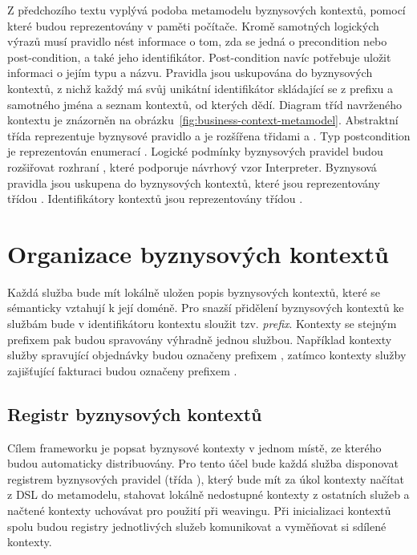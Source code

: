 Z předchozího textu vyplývá podoba metamodelu byznysových kontextů, pomocí které
budou reprezentovány v paměti počítače. Kromě samotných logických výrazů musí pravidlo nést
informace o tom, zda se jedná o precondition nebo post-condition, a také jeho identifikátor.
Post-condition navíc potřebuje uložit informaci o jejím typu a názvu. Pravidla jsou uskupována
do byznysových kontextů, z nichž každý má svůj unikátní identifikátor skládající se z prefixu
a samotného jména a seznam kontextů, od kterých dědí. Diagram tříd navrženého kontextu je znázorněn
na obrázku~\ref{fig:business-context-metamodel}. Abstraktní třída  reprezentuje
byznysové pravidlo a je rozšířena třidami  a . Typ
postcondition je reprezentován enumerací . Logické podmínky
byznysových pravidel budou rozšiřovat rozhraní , které podporuje návrhový vzor
Interpreter. Byznysová pravidla jsou uskupena do byznysových kontextů, které jsou reprezentovány
třídou . Identifikátory kontextů jsou reprezentovány třídou .

\section{Organizace byznysových kontextů}

Každá služba bude mít lokálně uložen popis byznysových kontextů, které se sémanticky vztahují
k její doméně. Pro snazší přidělení byznysových kontextů ke službám bude v identifikátoru kontextu sloužit
tzv. \textit{prefix}. Kontexty se stejným prefixem pak budou spravovány výhradně jednou službou. Například kontexty
služby spravující objednávky budou označeny prefixem , zatímco kontexty služby zajišťující fakturaci budou
označeny prefixem .

\subsection{Registr byznysových kontextů}\label{sec:registry-design}

Cílem frameworku je popsat byznysové kontexty v jednom místě, ze kterého budou
automaticky distribuovány. Pro tento účel bude každá služba disponovat registrem byznysových pravidel
(třída ), který bude mít za úkol kontexty načítat z \gls{DSL} do metamodelu,
stahovat lokálně nedostupné kontexty z ostatních služeb a načtené kontexty uchovávat pro použití při weavingu.
Při inicializaci kontextů spolu budou registry jednotlivých služeb komunikovat a vyměňovat si sdílené kontexty.

